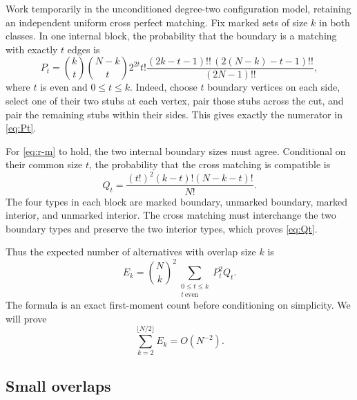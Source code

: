 \documentclass[11pt]{article}
\theoremstyle{remark}
\newcommand{\1}{\mathbf 1}
\begin{document}
Work temporarily in the unconditioned degree-two configuration model,
retaining an independent uniform cross perfect matching. Fix marked
sets of size $k$ in both classes. In one internal block, the probability
that the boundary is a matching with exactly $t$ edges is
\begin{equation}\label{eq:Pt}
 P_t=\binom kt\binom{N-k}t 2^{2t}t!
 \frac{(2k-t-1)!!\,(2(N-k)-t-1)!!}{(2N-1)!!},
\end{equation}
where $t$ is even and $0\leq t\leq k$.
Indeed, choose $t$ boundary vertices on each side, select one of their
two stubs at each vertex, pair those stubs across the cut, and pair
the remaining stubs within their sides. This gives exactly the
numerator in \eqref{eq:Pt}.

For \eqref{eq:r-m} to hold, the two internal boundary sizes must agree.
Conditional on their common size $t$, the probability that the cross
matching is compatible is
\begin{equation}\label{eq:Qt}
 Q_t=\frac{(t!)^2(k-t)!(N-k-t)!}{N!}.
\end{equation}
The four types in each block are marked boundary, unmarked boundary,
marked interior, and unmarked interior. The cross matching must
interchange the two boundary types and preserve the two interior types,
which proves \eqref{eq:Qt}.

Thus the expected number of alternatives with overlap size $k$ is
\begin{equation}\label{eq:Ek}
 E_k=\binom Nk^2\sum_{\substack{0\leq t\leq k\\t\ \mathrm{even}}}
                         P_t^2Q_t.
\end{equation}
The formula is an exact first-moment count before conditioning on
simplicity. We will prove
\begin{equation}\label{eq:rigidity-sum}
 \sum_{k=2}^{\lfloor N/2\rfloor}E_k=O(N^{-2}).
\end{equation}

\subsection{Small overlaps}
\end{document}
